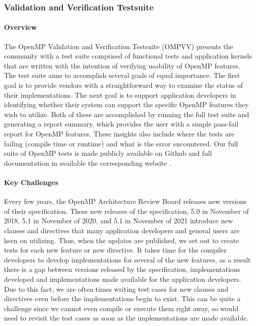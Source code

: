 \subsubsection{ Validation and Verification Testsuite}

\paragraph{Overview}
The OpenMP Validation and Verification Testsuite (OMPVV) presents the community with a test suite comprised of functional tests and application kernels that are written with the intention of verifying usability of OpenMP features. The test suite aims to accomplish several goals of equal importance. The first goal is to provide vendors with a straightforward way to examine the status of their implementations. The next goal is to support application developers in identifying whether their system can support the specific OpenMP features they wish to utilize. Both of these are accomplished by running the full test suite and generating a report summary, which provides the user with a simple pass-fail report for OpenMP features. These insights also include where the tests are failing (compile time or runtime) and what is the error encountered. Our full suite of OpenMP tests is made publicly available on Github \cite{sollvevvgithub} and full documentation in available the corresponding website \cite{sollvevvwebsite}. 

\paragraph{Key Challenges}
Every few years, the OpenMP Architecture Review Board releases new versions of their specification. These new releases of the specification, 5.0 in November of 2018, 5.1 in November of 2020, and 5.1 in November of 2021 introduce new clauses and directives that many application developers and general users are keen on utilizing. Thus, when the updates are published, we set out to create tests for each new feature or new directive. It takes time for the compiler developers to develop implementations for several of the new features, as a result there is a gap between versions released by the specification, implementations developed and implementations made available for the application developers. Due to this fact, we are often times writing test cases for new clauses and directives even before the implementations begin to exist. This can be quite a challenge since we cannot even compile or execute them right away, so would need to revisit the test cases as soon as the implementations are made available. 

